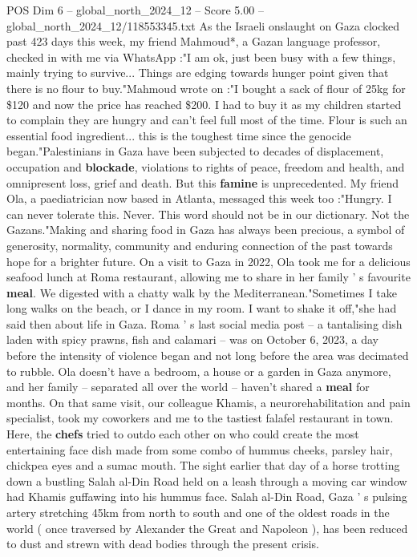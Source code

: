 \begin{textsample}{POS Dim 6 – global\_north\_2024\_12 – Score 5.00 – global\_north\_2024\_12/118553345.txt}  \label{ex:f6_pos_266}
As the Israeli onslaught on Gaza clocked past 423 days this week, my friend Mahmoud*, a Gazan language professor, checked in with me via WhatsApp :"I am ok, just been busy with a few things, mainly trying to survive...
Things are edging towards hunger point given that there is no flour to buy."Mahmoud wrote on :"I bought a sack of flour of 25kg for \$120 and now the price has reached \$200.
I had to buy it as my children started to complain they are hungry and can't feel full most of the time.
Flour is such an essential food ingredient... this is the toughest time since the genocide began."Palestinians in Gaza have been subjected to decades of displacement, occupation and \textbf{blockade}, violations to rights of peace, freedom and health, and omnipresent loss, grief and death.
But this \textbf{famine} is unprecedented.
My friend Ola, a paediatrician now based in Atlanta, messaged this week too :"Hungry.
I can never tolerate this.
Never.
This word should not be in our dictionary.
Not the Gazans."Making and sharing food in Gaza has always been precious, a symbol of generosity, normality, community and enduring connection of the past towards hope for a brighter future.
On a visit to Gaza in 2022, Ola took me for a delicious seafood lunch at Roma restaurant, allowing me to share in her family ' s favourite \textbf{meal}.
We digested with a chatty walk by the Mediterranean."Sometimes I take long walks on the beach, or I dance in my room.
I want to shake it off,"she had said then about life in Gaza.
Roma ' s last social media post -- a tantalising dish laden with spicy prawns, fish and calamari -- was on October 6, 2023, a day before the intensity of violence began and not long before the area was decimated to rubble.
Ola doesn't have a bedroom, a house or a garden in Gaza anymore, and her family -- separated all over the world -- haven't shared a \textbf{meal} for months.
On that same visit, our colleague Khamis, a neurorehabilitation and pain specialist, took my coworkers and me to the tastiest falafel restaurant in town.
Here, the \textbf{chefs} tried to outdo each other on who could create the most entertaining face dish made from some combo of hummus cheeks, parsley hair, chickpea eyes and a sumac mouth.
The sight earlier that day of a horse trotting down a bustling Salah al-Din Road held on a leash through a moving car window had Khamis guffawing into his hummus face.
Salah al-Din Road, Gaza ' s pulsing artery stretching 45km from north to south and one of the oldest roads in the world ( once traversed by Alexander the Great and Napoleon ), has been reduced to dust and strewn with dead bodies through the present crisis.

\end{textsample}
